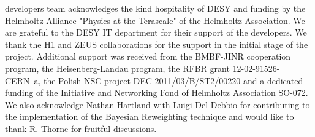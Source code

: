 %
%

\begin{acknowledgements}
\fitter developers team acknowledges the kind hospitality of DESY 
and funding by the Helmholtz Alliance "Physics at the Terascale" of the Helmholtz Association.
We are grateful to the DESY IT department for their support of the \fitter  developers. We thank the H1 and ZEUS collaborations for the support in the initial stage of the project.
Additional support was received from the BMBF-JINR cooperation program,
the Heisenberg-Landau program, the RFBR grant 12-02-91526-CERN~a, 
the Polish NSC project DEC-2011/03/B/ST2/00220 and 
a dedicated funding of the Initiative and Networking Fond of Helmholtz Association SO-072. 
We also acknowledge Nathan Hartland with Luigi Del Debbio for contributing to the 
implementation of the Bayesian Reweighting technique and
would like to thank R. Thorne for fruitful discussions.
\end{acknowledgements}




